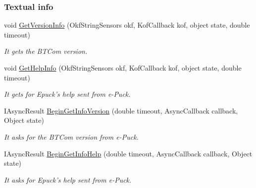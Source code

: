 \subsubsection*{Textual info} %
\label{ssub:Textual infon}
  \begin{DoxyCompactItemize}
  \item   void \hyperlink{class_elib_1_1_epuck_aa7ed3e58936ccd1d52596b318d5ddccc}{GetVersionInfo} (OkfStringSensors okf, KofCallback kof, object state, double timeout)
  \begin{DoxyCompactList}\small\item\em It gets the BTCom version. \item\end{DoxyCompactList}

  \item   void \hyperlink{class_elib_1_1_epuck_a1569f01c2a34bb335d2f7a12c94de891}{GetHelpInfo} (OkfStringSensors okf, KofCallback kof, object state, double timeout)
  \begin{DoxyCompactList}\small\item\em It gets for Epuck's help sent from e-\/Puck. \item\end{DoxyCompactList}

  \item   IAsyncResult \hyperlink{class_elib_1_1_epuck_a0146f79525c327c913b540186e354916}{BeginGetInfoVersion} (double timeout, AsyncCallback callback, Object state)
  \begin{DoxyCompactList}\small\item\em It asks for the BTCom version from e-\/Puck. \item\end{DoxyCompactList}

  \item   IAsyncResult \hyperlink{class_elib_1_1_epuck_a0e599fe0065ac2c3ae2ac96aede901c6}{BeginGetInfoHelp} (double timeout, AsyncCallback callback, Object state)
  \begin{DoxyCompactList}\small\item\em It asks for Epuck's help sent from e-\/Puck. \item\end{DoxyCompactList}

  \end{DoxyCompactItemize}

